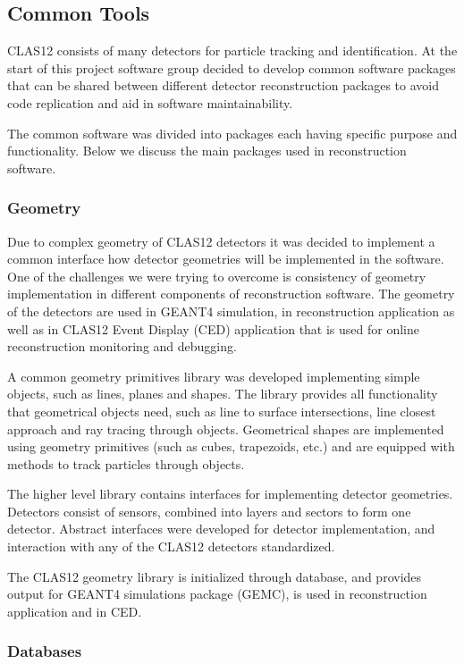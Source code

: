 \documentclass{elsart}
\begin{document}
\subsection{Common Tools}
\label{common-tools}

CLAS12 consists of many detectors for particle tracking and identification. At the start of this project software
group decided to develop common software packages that can be shared between different detector reconstruction
packages to avoid code replication and aid in software maintainability.

The common software was divided into packages each having specific purpose and functionality. Below we discuss
the main packages used in reconstruction software.

\subsubsection{Geometry}

Due to complex geometry of CLAS12 detectors it was decided to implement a common interface how detector
geometries will be implemented in the software. One of the challenges we were trying to overcome is consistency
of geometry implementation in different components of reconstruction software. The geometry of the detectors
are used in GEANT4 simulation, in reconstruction application as well as in CLAS12 Event Display (CED) application
that is used for online reconstruction monitoring and debugging.

A common geometry primitives library was developed implementing simple objects, such as lines, planes and shapes.
The library provides all functionality that geometrical objects need, such as line to surface intersections, line closest
approach and ray tracing through objects. Geometrical shapes are implemented using geometry primitives (such as
cubes, trapezoids, etc.) and are equipped with methods to track particles through objects.

The higher level library contains interfaces for implementing detector geometries. Detectors consist of sensors,
combined into layers and sectors to form one detector. Abstract interfaces were developed for detector
implementation, and interaction with any of the CLAS12 detectors standardized.

The CLAS12 geometry library is initialized through database, and provides output for GEANT4 simulations package
(GEMC), is used in reconstruction application and in CED.

\subsubsection{Databases}
\end{document}
